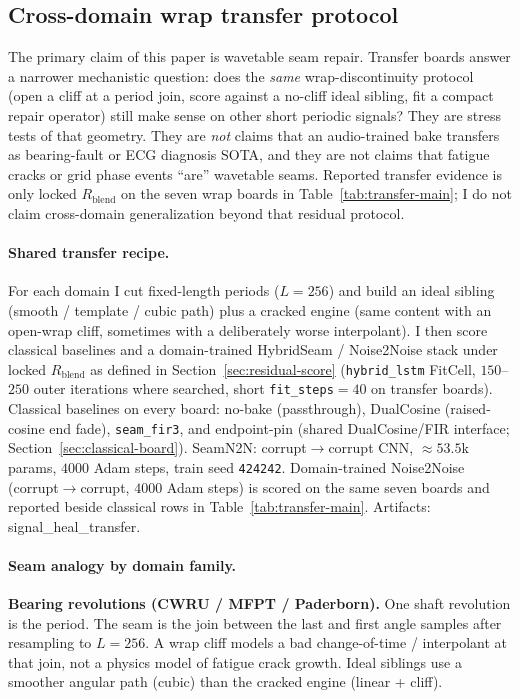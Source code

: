 
\subsection{Cross-domain wrap transfer protocol}
\label{sec:transfer-protocol}

The primary claim of this paper is wavetable seam repair.
Transfer boards answer a narrower mechanistic question:
does the \emph{same} wrap-discontinuity protocol (open a cliff at a period join, score against a no-cliff ideal sibling, fit a compact repair operator) still make sense on other short periodic signals?
They are stress tests of that geometry.
They are \emph{not} claims that an audio-trained bake transfers as bearing-fault or ECG diagnosis SOTA,
and they are not claims that fatigue cracks or grid phase events ``are'' wavetable seams.
Reported transfer evidence is only locked $R_{\mathrm{blend}}$ on the seven wrap boards in Table~\ref{tab:transfer-main}; I do not claim cross-domain generalization beyond that residual protocol.

\paragraph{Shared transfer recipe.}
For each domain I cut fixed-length periods ($L{=}256$) and build an ideal sibling (smooth / template / cubic path) plus a cracked engine (same content with an open-wrap cliff, sometimes with a deliberately worse interpolant).
I then score classical baselines and a domain-trained HybridSeam / Noise2Noise stack under locked $R_{\mathrm{blend}}$ as defined in Section~\ref{sec:residual-score}
(\texttt{hybrid\_lstm} FitCell, $150$--$250$ outer iterations where searched, short \texttt{fit\_steps}${}={}40$ on transfer boards).
Classical baselines on every board: no-bake (passthrough), DualCosine (raised-cosine end fade), \texttt{seam\_fir3}, and endpoint-pin (shared DualCosine/FIR interface; Section~\ref{sec:classical-board}).
SeamN2N: corrupt$\to$corrupt CNN, ${\approx}53.5$k params, $4000$ Adam steps, train seed \texttt{424242}.
Domain-trained Noise2Noise (corrupt$\to$corrupt, $4000$ Adam steps) is scored on the same seven boards and reported beside classical rows in Table~\ref{tab:transfer-main}.
Artifacts:
signal\_heal\_transfer.

\paragraph{Seam analogy by domain family.}
\textbf{Bearing revolutions (CWRU / MFPT / Paderborn).}
One shaft revolution is the period.
The seam is the join between the last and first angle samples after resampling to $L{=}256$.
A wrap cliff models a bad change-of-time / interpolant at that join, not a physics model of fatigue crack growth.
Ideal siblings use a smoother angular path (cubic) than the cracked engine (linear + cliff).


